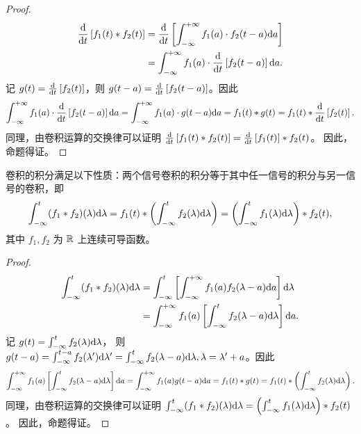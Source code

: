 \begin{proof}
    \begin{align*}
        \frac{\D}{\D{t}}\left[f_1(t) * f_2(t)\right]
        & = \frac{\D}{\D{t}}\left[\int_{-\infty}^{+\infty}f_1(a) \cdot f_2(t - a)\D{a}\right] \\
        & = \int_{-\infty}^{+\infty}f_1(a) \cdot \frac{\D}{\D{t}}\left[f_2(t - a)\right]\D{a}.
    \end{align*}
    记 $g(t) = \frac{\D}{\D{t}}\left[f_2(t)\right]$，则 $g(t - a) = \frac{\D}{\D{t}}\left[f_2(t - a)\right]$。因此
    \begin{align*}
        \int_{-\infty}^{+\infty}f_1(a) \cdot \frac{\D}{\D{t}}\left[f_2(t - a)\right]\D{a}
        = \int_{-\infty}^{+\infty}f_1(a) \cdot g(t - a)\D{a}
        = f_1(t) * g(t)
        = f_1(t) * \frac{\D}{\D{t}}\left[f_2(t)\right].
    \end{align*}
    同理，由卷积运算的交换律可以证明 $\frac{\D}{\D{t}}\left[f_1(t) * f_2(t)\right] = \frac{\D}{\D{t}}\left[f_1(t)\right] * f_2(t)$。
    因此，命题得证。
\end{proof}

\begin{property}[卷积的积分性质]
    卷积的积分满足以下性质：两个信号卷积的积分等于其中任一信号的积分与另一信号的卷积，即
    \begin{align*}
        \int_{-\infty}^{t}(f_1 * f_2)(\lambda)\mathrm{d}\lambda
        = f_1(t) * \left(\int_{-\infty}^{t}f_2(\lambda)\mathrm{d}\lambda\right)
        = \left(\int_{-\infty}^{t}f_1(\lambda)\mathrm{d}\lambda\right) * f_2(t),
    \end{align*}
    其中 $f_1, f_2$ 为  $\mathbb{R}$ 上连续可导函数。
\end{property}

\begin{proof}
    \begin{align*}
        \int_{-\infty}^{t}(f_1 * f_2)(\lambda)\mathrm{d}\lambda
        & = \int_{-\infty}^{t}\left[\int_{-\infty}^{+\infty}f_1(a)f_2(\lambda - a)\mathrm{d}a\right]\mathrm{d}\lambda \\
        & = \int_{-\infty}^{+\infty}f_1(a)\left[\int_{-\infty}^{t}f_2(\lambda - a)\mathrm{d}\lambda\right]\mathrm{d}a.
    \end{align*}
    记 $g(t) = \int_{-\infty}^{t}f_2(\lambda)\mathrm{d}\lambda$，
    则 $g(t - a) = \int_{-\infty}^{t - a}f_2(\lambda')\mathrm{d}\lambda' = \int_{-\infty}^{t}f_2(\lambda - a)\mathrm{d}\lambda, \lambda = \lambda' + a$。因此
    \begin{align*}
        \int_{-\infty}^{+\infty}f_1(a)\left[\int_{-\infty}^{t}f_2(\lambda - a)\mathrm{d}\lambda\right]\mathrm{d}a
        = \int_{-\infty}^{+\infty}f_1(a)g(t - a)\mathrm{d}a
        = f_1(t) * g(t)
        = f_1(t) * \left(\int_{-\infty}^{t}f_2(\lambda)\mathrm{d}\lambda\right).
    \end{align*}
    同理，由卷积运算的交换律可以证明 $\int_{-\infty}^{t}(f_1 * f_2)(\lambda)\mathrm{d}\lambda = \left(\int_{-\infty}^{t}f_1(\lambda)\mathrm{d}\lambda\right) * f_2(t)$。
    因此，命题得证。
    
\end{proof}

